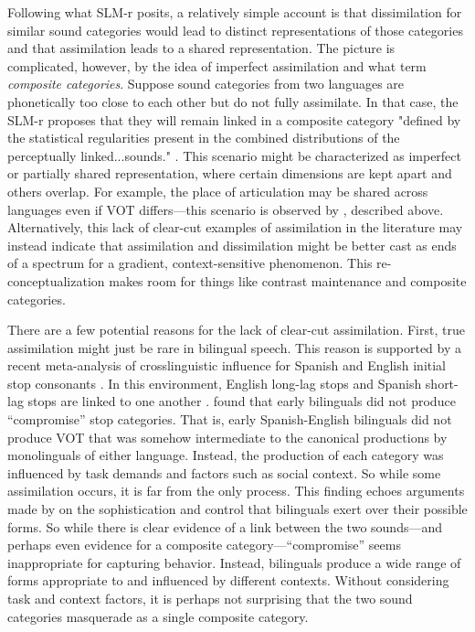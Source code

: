 Following what SLM-r posits, a relatively simple account is that dissimilation for similar sound categories would lead to distinct representations of those categories and that assimilation leads to a shared representation. The picture is complicated, however, by the idea of imperfect assimilation and what \citeauthor{flege_2021_slmr} term \textit{composite categories}. Suppose sound categories from two languages are phonetically too close to each other but do not fully assimilate. In that case, the SLM-r proposes that they will remain linked in a composite category "defined by the statistical regularities present in the combined distributions of the perceptually linked...sounds." \citep[][p. 41]{flege_2021_slmr}. This scenario might be characterized as imperfect or partially shared representation, where certain dimensions are kept apart and others overlap. For example, the place of articulation may be shared across languages even if VOT differs---this scenario is observed by \citet{sundara_2006_production}, described above. Alternatively, this lack of clear-cut examples of assimilation in the literature may instead indicate that assimilation and dissimilation might be better cast as ends of a spectrum for a gradient, context-sensitive phenomenon. This re-conceptualization makes room for things like contrast maintenance and composite categories.

There are a few potential reasons for the lack of clear-cut assimilation. First, true assimilation might just be rare in bilingual speech. This reason is supported by a recent meta-analysis of crosslinguistic influence for Spanish and English initial stop consonants \citep{casillas_2021_interlingual}. In this environment, English long-lag stops and Spanish short-lag stops are linked to one another \citep{fricke_2016_phonetic, goldrick_2014_switching, bullock_2009_sociophonetics, olson_2016_transfer}. \citeauthor{casillas_2021_interlingual} found that early bilinguals did not produce ``compromise'' stop categories. That is, early Spanish-English bilinguals did not produce VOT that was somehow intermediate to the canonical productions by monolinguals of either language. Instead, the production of each category was influenced by task demands and factors such as social context. So while some assimilation occurs, it is far from the only process. This finding echoes arguments made by \citet{bullock_2009_sociophonetics} on the sophistication and control that bilinguals exert over their possible forms. So while there is clear evidence of a link between the two sounds---and perhaps even evidence for a composite category---``compromise'' seems inappropriate for capturing behavior. Instead, bilinguals produce a wide range of forms appropriate to and influenced by different contexts. Without considering task and context factors, it is perhaps not surprising that the two sound categories masquerade as a single composite category. 

